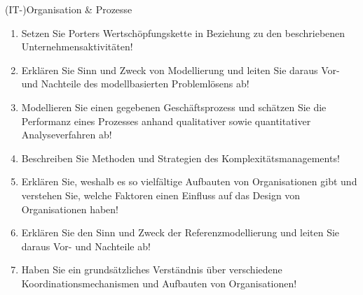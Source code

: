 \documentclass{article}
\begin{document}
\begin{exercise}{(IT-)Organisation \& Prozesse}
  \begin{enumerate}
    \item Setzen Sie Porters Wertschöpfungskette in Beziehung zu den beschriebenen Unternehmensaktivitäten!
    \item Erklären Sie Sinn und Zweck von Modellierung und leiten Sie daraus Vor- und Nachteile des modellbasierten Problemlösens ab!
    \item Modellieren Sie einen gegebenen Geschäftsprozess und schätzen Sie die Performanz eines Prozesses anhand qualitativer sowie quantitativer Analyseverfahren ab!
    \item Beschreiben Sie Methoden und Strategien des Komplexitätsmanagements!
    \item Erklären Sie, weshalb es so vielfältige Aufbauten von Organisationen gibt und verstehen Sie, welche Faktoren einen Einfluss auf das Design von Organisationen haben!
    \item Erklären Sie den Sinn und Zweck der Referenzmodellierung und leiten Sie daraus Vor- und Nachteile ab!
    \item Haben Sie ein grundsätzliches Verständnis über verschiedene Koordinationsmechanismen und Aufbauten von Organisationen!
  \end{enumerate}
\end{exercise}
\end{document}
